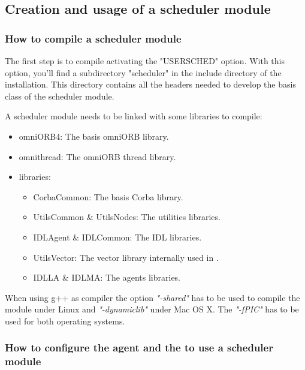 \subsection{Creation and usage of a scheduler module}
\subsubsection{How to compile a scheduler module}
The first step is to compile \diet activating the "USERSCHED" option.
With this option, you'll find a subdirectory "scheduler" in the include
directory of the \diet installation. This directory contains all the headers
needed to develop the basis class of the scheduler module.

A scheduler module needs to be linked with some libraries to compile:
\begin{itemize}
  \item omniORB4: The basis omniORB library.
  \item omnithread: The omniORB thread library.
  \item \diet libraries:
    \begin{itemize}
      \item CorbaCommon: The basis \diet Corba library.
      \item UtilsCommon \& UtilsNodes: The \diet utilities libraries.
      \item IDLAgent \& IDLCommon: The IDL \diet libraries.
      \item UtilsVector: The vector library internally used in \diet.
      \item IDLLA \& IDLMA: The agents libraries.
    \end{itemize}
\end{itemize}
When using g++ as compiler the option \textit{"-shared"} has to be used to
compile the module under Linux and \textit{"-dynamiclib"} under Mac OS X.
The \textit{"-fPIC"} has to be used for both operating systems.

\subsubsection{How to configure the agent and the {\sed} to use a
  scheduler module}

